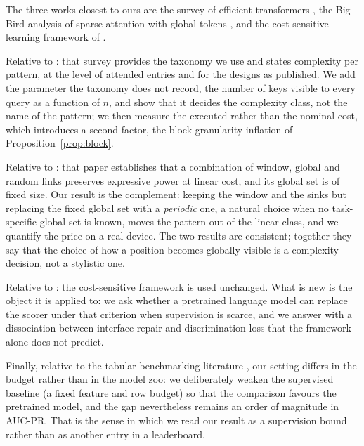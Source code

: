 The three works closest to ours are the survey of efficient transformers
\cite{tay2022efficient}, the Big Bird analysis of sparse attention with global
tokens \cite{zaheer2020bigbird}, and the cost-sensitive learning framework of
\cite{elkan2001foundations}.

Relative to \cite{tay2022efficient}: that survey provides the taxonomy we use and
states complexity per pattern, at the level of attended entries and for the
designs as published. We add the parameter the taxonomy does not record, the
number of keys visible to every query as a function of $n$, and show that it
decides the complexity class, not the name of the pattern; we then measure
the executed rather than the nominal cost, which introduces a second factor, the
block-granularity inflation of Proposition~\ref{prop:block}.

Relative to \cite{zaheer2020bigbird}: that paper establishes that a combination
of window, global and random links preserves expressive power at linear cost, and
its global set is of fixed size. Our result is the complement: keeping the
window and the sinks but replacing the fixed global set with a \emph{periodic}
one, a natural choice when no task-specific global set is known, moves the
pattern out of the linear class, and we quantify the price on a real device. The
two results are consistent; together they say that the choice of how a position
becomes globally visible is a complexity decision, not a stylistic one.

Relative to \cite{elkan2001foundations}: the cost-sensitive framework is used
unchanged. What is new is the object it is applied to: we ask whether a
pretrained language model can replace the scorer under that criterion when
supervision is scarce, and we answer with a dissociation between interface
repair and discrimination loss that the framework alone does not predict.

Finally, relative to the tabular benchmarking literature
\cite{gorishniy2021revisiting,grinsztajn2022why}, our setting differs in the
budget rather than in the model zoo: we deliberately weaken the supervised
baseline (a fixed feature and row budget) so that the comparison favours the
pretrained model, and the gap nevertheless remains an order of magnitude in
AUC-PR. That is the sense in which we read our result as a supervision bound
rather than as another entry in a leaderboard.
